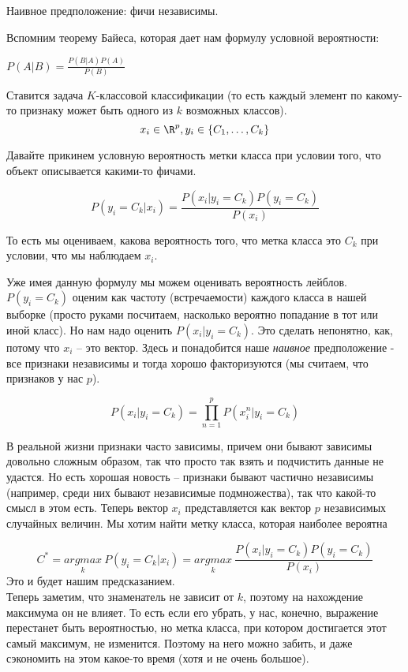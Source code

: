 Наивное предположение: фичи независимы. 

Вспомним теорему Байеса, которая дает нам формулу условной вероятности:

$P(A|B) = \frac{P(B|A)P(A)}{P(B)}$

Ставится задача $K$-классовой классификации (то есть каждый элемент по какому-то признаку может быть одного из $k$ возможных классов). $$x_i \in \R^p, y_i \in \{C_1, \dots, C_k\}$$

Давайте прикинем условную вероятность метки класса при условии того, что объект описывается какими-то фичами.

$$P(y_i = C_k|x_i) = \frac{P(x_i|y_i = C_k)P(y_i = C_k)}{P(x_i)}$$

То есть мы оцениваем, какова вероятность того, что метка класса это $C_k$ при условии, что мы наблюдаем $x_i$.

Уже имея данную формулу мы можем оценивать вероятность лейблов. $P(y_i = C_k)$ оценим как частоту (встречаемости) каждого класса в нашей выборке (просто руками посчитаем, насколько вероятно попадание в тот или иной класс). Но нам надо оценить $P(x_i|y_i = C_k)$. Это сделать непонятно, как, потому что $x_i$ -- это вектор. Здесь и понадобится наше \textit{наивное} предположение - все признаки независимы и тогда хорошо факторизуются (мы считаем, что признаков у нас $p$).

$$P(x_i|y_i = C_k) = \prod\limits_{n = 1}^p P(x_i^n|y_i = C_k)$$

В реальной жизни признаки часто зависимы, причем они бывают зависимы довольно сложным образом, так что просто так взять и подчистить данные не удастся. Но есть хорошая новость -- признаки бывают частично независимы (например, среди них бывают независимые подмножества), так что какой-то смысл в этом есть. Теперь вектор $x_i$ представляется как вектор $p$ независимых случайных величин. Мы хотим найти метку класса, которая наиболее вероятна

$$C^* = \underset{k}{argmax} ~ P(y_i = C_k|x_i) = \underset{k}{argmax} ~ \frac{P(x_i|y_i = C_k)P(y_i = C_k)}{P(x_i)}$$ Это и будет нашим предсказанием.\\

Теперь заметим, что знаменатель не зависит от $k$, поэтому на нахождение максимума он не влияет. То есть если его убрать, у нас, конечно, выражение перестанет быть вероятностью, но метка класса, при котором достигается этот самый максимум, не изменится. Поэтому на него можно забить, и даже сэкономить на этом какое-то время (хотя и не очень большое).

